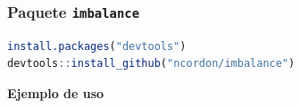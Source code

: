  \fontsize{10pt}{0}\selectfont
 \begin{frame}[fragile]\frametitle{Paquete \texttt{imbalance}}
  \begin{lstlisting}[language=R,numbers=none]
install.packages("devtools")
devtools::install_github("ncordon/imbalance")
  \end{lstlisting}
  
  \par\textbf{Ejemplo de uso}
  

  
 
 \end{frame}
